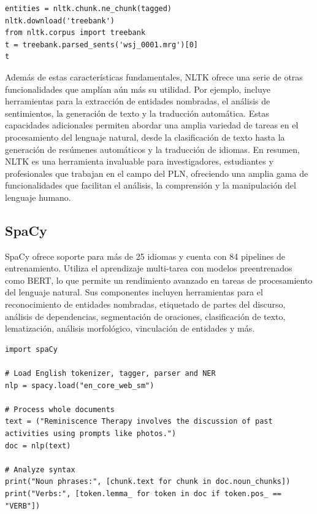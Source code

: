 \begin{lstlisting}[style=SpyderStyle, caption={Análisis sintáctico y lematización con nltk}, captionpos=b, label={lst:python},breaklines = true]
entities = nltk.chunk.ne_chunk(tagged)
nltk.download('treebank')
from nltk.corpus import treebank
t = treebank.parsed_sents('wsj_0001.mrg')[0]
t
\end{lstlisting}


Además de estas características fundamentales, NLTK ofrece una serie de otras funcionalidades que amplían aún más su utilidad. Por ejemplo, incluye herramientas para la extracción de entidades nombradas, el análisis de sentimientos, la generación de texto y la traducción automática. Estas capacidades adicionales permiten abordar una amplia variedad de tareas en el procesamiento del lenguaje natural, desde la clasificación de texto hasta la generación de resúmenes automáticos y la traducción de idiomas. En resumen, NLTK es una herramienta invaluable para investigadores, estudiantes y profesionales que trabajan en el campo del PLN, ofreciendo una amplia gama de funcionalidades que facilitan el análisis, la comprensión y la manipulación del lenguaje humano.


\subsection{SpaCy}


SpaCy ofrece soporte para más de 25 idiomas y cuenta con 84 pipelines de entrenamiento. Utiliza el aprendizaje multi-tarea con modelos preentrenados como BERT, lo que permite un rendimiento avanzado en tareas de procesamiento del lenguaje natural. Sus componentes incluyen herramientas para el reconocimiento de entidades nombradas, etiquetado de partes del discurso, análisis de dependencias, segmentación de oraciones, clasificación de texto, lematización, análisis morfológico, vinculación de entidades y más.

\begin{lstlisting}[style=SpyderStyle, caption={Ejemplo de tokenización usando spaCy}, captionpos=b, label={lst:python},breaklines = true]
import spaCy

# Load English tokenizer, tagger, parser and NER
nlp = spacy.load("en_core_web_sm")

# Process whole documents
text = ("Reminiscence Therapy involves the discussion of past activities using prompts like photos.")
doc = nlp(text)

# Analyze syntax
print("Noun phrases:", [chunk.text for chunk in doc.noun_chunks])
print("Verbs:", [token.lemma_ for token in doc if token.pos_ == "VERB"])
\end{lstlisting}

